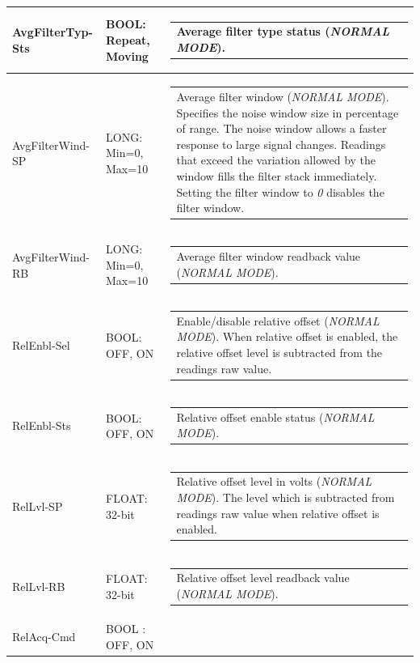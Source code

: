 \documentclass[openany]{article}
\begin{document}
\begin{longtable}{| m{3.0cm} m{4.5cm} m{7.0cm} |}
		AvgFilterTyp-Sts & BOOL: Repeat, Moving & \begin{tabular}{@{}m{6cm}@{}}
	    					Average filter type status (\emph{NORMAL MODE}).
						\end{tabular} \\ \hline
		AvgFilterWind-SP & LONG: Min=0, Max=10 & \begin{tabular}{@{}m{6cm}@{}}
	    					Average filter window (\emph{NORMAL MODE}). Specifies the noise window size in percentage of range. The noise window allows a faster response to large signal changes. Readings that exceed the variation allowed by the window fills the filter stack immediately. Setting the filter window to \emph{0} disables the filter window.
						\end{tabular} \\ \hline
		AvgFilterWind-RB & LONG: Min=0, Max=10 & \begin{tabular}{@{}m{6cm}@{}}
	    					Average filter window readback value (\emph{NORMAL MODE}).
						\end{tabular} \\ \hline
		RelEnbl-Sel & BOOL: OFF, ON & \begin{tabular}{@{}m{6cm}@{}}
	    					Enable/disable relative offset (\emph{NORMAL MODE}). When relative offset is enabled, the relative offset level is subtracted from the readings raw value.
						\end{tabular} \\ \hline
		RelEnbl-Sts & BOOL: OFF, ON & \begin{tabular}{@{}m{6cm}@{}}
	    					Relative offset enable status (\emph{NORMAL MODE}).
						\end{tabular} \\ \hline
		RelLvl-SP & FLOAT: 32-bit & \begin{tabular}{@{}m{6cm}@{}}
	    					Relative offset level in volts (\emph{NORMAL MODE}). The level which is subtracted from readings raw value when relative offset is enabled.
						\end{tabular} \\ \hline
		RelLvl-RB & FLOAT: 32-bit & \begin{tabular}{@{}m{6cm}@{}}
	    					Relative offset level readback value (\emph{NORMAL MODE}).
						\end{tabular} \\ \hline
		RelAcq-Cmd & BOOL : OFF, ON & \begin{tabular}{@{}m{6cm}@{}}

\end{tabular}
\end{longtable}
\end{document}
